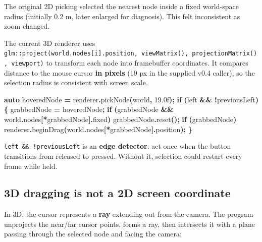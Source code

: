 \documentclass[
  10pt,
  a4paper,
]{article}
\newenvironment{Shaded}{\begin{snugshade}}{\end{snugshade}}
\newcommand{\BuiltInTok}[1]{#1}
\newcommand{\ControlFlowTok}[1]{\textcolor[rgb]{0.13,0.29,0.53}{\textbf{#1}}}
\newcommand{\FloatTok}[1]{\textcolor[rgb]{0.00,0.00,0.81}{#1}}
\newcommand{\KeywordTok}[1]{\textcolor[rgb]{0.13,0.29,0.53}{\textbf{#1}}}
\newcommand{\NormalTok}[1]{#1}
\newcommand{\OperatorTok}[1]{\textcolor[rgb]{0.81,0.36,0.00}{\textbf{#1}}}
\begin{document}
The original 2D picking selected the nearest node inside a fixed
world-space radius (initially 0.2 m, later enlarged for diagnosis). This
felt inconsistent as zoom changed.

The current 3D renderer uses
\texttt{glm::project(world.nodes{[}i{]}.position,\ viewMatrix(),\ projectionMatrix(),\ viewport)}
to transform each node into framebuffer coordinates. It compares
distance to the mouse cursor \textbf{in pixels} (19 px in the supplied
v0.4 caller), so the selection radius is consistent with screen scale.

\begin{Shaded}
\begin{Highlighting}[]
\KeywordTok{auto}\NormalTok{ hoveredNode }\OperatorTok{=}\NormalTok{ renderer}\OperatorTok{.}\NormalTok{pickNode}\OperatorTok{(}\NormalTok{world}\OperatorTok{,} \FloatTok{19.0}\BuiltInTok{f}\OperatorTok{);}
\ControlFlowTok{if} \OperatorTok{(}\NormalTok{left }\OperatorTok{\&\&} \OperatorTok{!}\NormalTok{previousLeft}\OperatorTok{)} \OperatorTok{\{}
\NormalTok{    grabbedNode }\OperatorTok{=}\NormalTok{ hoveredNode}\OperatorTok{;}
    \ControlFlowTok{if} \OperatorTok{(}\NormalTok{grabbedNode }\OperatorTok{\&\&}\NormalTok{ world}\OperatorTok{.}\NormalTok{nodes}\OperatorTok{[*}\NormalTok{grabbedNode}\OperatorTok{].}\NormalTok{fixed}\OperatorTok{)}
\NormalTok{        grabbedNode}\OperatorTok{.}\NormalTok{reset}\OperatorTok{();}
    \ControlFlowTok{if} \OperatorTok{(}\NormalTok{grabbedNode}\OperatorTok{)}
\NormalTok{        renderer}\OperatorTok{.}\NormalTok{beginDrag}\OperatorTok{(}\NormalTok{world}\OperatorTok{.}\NormalTok{nodes}\OperatorTok{[*}\NormalTok{grabbedNode}\OperatorTok{].}\NormalTok{position}\OperatorTok{);}
\OperatorTok{\}}
\end{Highlighting}
\end{Shaded}

\texttt{left\ \&\&\ !previousLeft} is an \textbf{edge detector}: act
once when the button transitions from released to pressed. Without it,
selection could restart every frame while held.

\subsection{3D dragging is not a 2D screen
coordinate}\label{d-dragging-is-not-a-2d-screen-coordinate}

In 3D, the cursor represents a \textbf{ray} extending out from the
camera. The program unprojects the near/far cursor points, forms a ray,
then intersects it with a plane passing through the selected node and
facing the camera:
\end{document}
